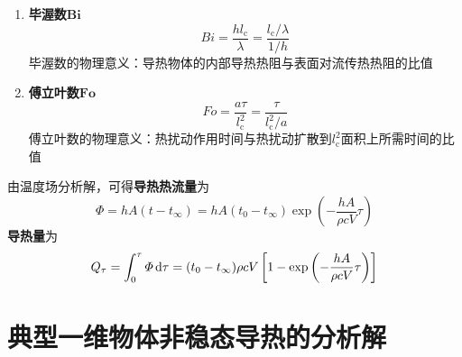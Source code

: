 \begin{enumerate}[\textbf{步骤} 1 ]
\begin{enumerate}[\hspace*{2em}(1) ]
	\item \textbf{毕渥数$\bm{Bi}$}
	\begin{equation}
		Bi = \dfrac{h l_\text{c}}{\lambda} = \dfrac{l_\text{c}/\lambda}{1/h}
	\end{equation}
	毕渥数的物理意义：导热物体的内部导热热阻与表面对流传热热阻的比值

	\item \textbf{傅立叶数$\bm{Fo}$}
	\begin{equation}
		Fo = \dfrac{a \tau}{l_{\text{c}}^2} = \dfrac{\tau}{l_{\text{c}}^2 / a}
	\end{equation}
	傅立叶数的物理意义：热扰动作用时间与热扰动扩散到$l_{\text{c}}^2$面积上所需时间的比值
	\end{enumerate}

	由温度场分析解，可得\textbf{导热热流量}为
	\begin{equation}
		\varPhi = hA(t - t_\infty) = hA(t_0 - t_\infty) \exp\left(- \dfrac{hA}{\rho c V} \tau \right)
	\end{equation}
	\textbf{导热量}为
	\begin{equation}
		Q_{\tau} = \int_{0}^\tau \varPhi \, {\rm{d}} \tau =  (t_0 - t_\infty) \rho c V\left[1 -\exp\left(- \dfrac{hA}{\rho c V} \tau \right) \right]
	\end{equation}
\end{enumerate}
\warn[
{
\begin{enumerate}[1.]
	\item 集中参数法适用的条件是\textcolor{red}{$Bi$数很小}
	\item 当按特征长度$l$定义的$Bi$数满足
	\begin{equation}
		Bi = \dfrac{hl}{\lambda} \le 0.1
	\end{equation}
	时，采用集中参数法计算的误差满足工程要求
	\item 常见导热体的特征长度
	\begin{equation}
		\begin{cases}
			\, l = \delta, & \mbox{厚度为}2\delta\mbox{的平板}\\
			\, l = R, & \mbox{底面半径为}R\mbox{的圆柱}\\
			\, l = R, & \mbox{半径为}R\mbox{的球}
		\end{cases}
	\end{equation}
\end{enumerate}
}
]

\section{典型一维物体非稳态导热的分析解}

